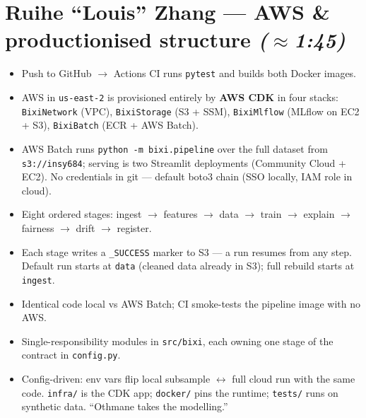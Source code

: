 \documentclass[11pt]{article}
\newcommand{\arr}{$\rightarrow$}
\newcommand{\presenter}[2]{\par\medskip\noindent{\color{#2}\rule{3pt}{12pt}}\hspace{4pt}{\bfseries #1}\par}
\newcommand{\timing}[1]{\hfill{\small\itshape\color{slate}(#1)}}
\begin{document}
\section{Ruihe ``Louis'' Zhang --- AWS \& productionised structure \timing{$\approx$1:45}}
\presenter{Slide 4 --- Architecture, all infrastructure-as-code}{amber}
\begin{itemize}
  \item Push to GitHub \arr{} Actions CI runs \texttt{pytest} and builds both Docker images.
  \item AWS in \texttt{us-east-2} is provisioned entirely by \textbf{AWS CDK} in four stacks:
        \texttt{BixiNetwork} (VPC), \texttt{BixiStorage} (S3 + SSM), \texttt{BixiMlflow}
        (MLflow on EC2 + S3), \texttt{BixiBatch} (ECR + AWS Batch).
  \item AWS Batch runs \texttt{python -m bixi.pipeline} over the full dataset from \texttt{s3://insy684};
        serving is two Streamlit deployments (Community Cloud + EC2). No credentials in git ---
        default boto3 chain (SSO locally, IAM role in cloud).
\end{itemize}

\presenter{Slide 5 --- Resumable, staged pipeline}{amber}
\begin{itemize}
  \item Eight ordered stages: ingest \arr{} features \arr{} data \arr{} train \arr{} explain \arr{}
        fairness \arr{} drift \arr{} register.
  \item Each stage writes a \texttt{\_SUCCESS} marker to S3 --- a run resumes from any step. Default
        run starts at \texttt{data} (cleaned data already in S3); full rebuild starts at \texttt{ingest}.
  \item Identical code local vs AWS Batch; CI smoke-tests the pipeline image with no AWS.
\end{itemize}

\presenter{Slide 6 --- Repository structure}{amber}
\begin{itemize}
  \item Single-responsibility modules in \texttt{src/bixi}, each owning one stage of the contract in
        \texttt{config.py}.
  \item Config-driven: env vars flip local subsample $\leftrightarrow$ full cloud run with the same code.
        \texttt{infra/} is the CDK app; \texttt{docker/} pins the runtime; \texttt{tests/} runs on
        synthetic data. ``Othmane takes the modelling.''
\end{itemize}
\end{document}

